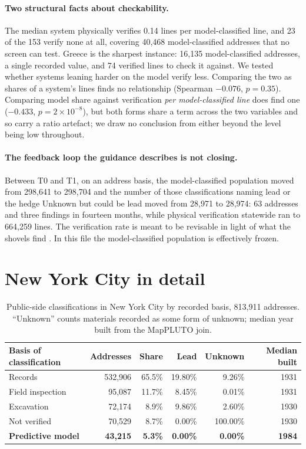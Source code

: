 \documentclass[11pt]{article}
\newcommand{\CBL}{\textsf{Unknown but could be lead}}
\begin{document}
\paragraph{Two structural facts about checkability.}
The median system physically verifies 0.14 lines per model-classified line, and 23 of the 153
verify none at all, covering 40,468 model-classified addresses that no screen can test. Greece
is the sharpest instance: 16,135 model-classified addresses, a single recorded value, and 74
verified lines to check it against. We tested whether systems leaning harder on the model
verify less. Comparing the two as shares of a system's lines finds no relationship (Spearman
$-0.076$, $p = 0.35$). Comparing model share against verification \emph{per model-classified
line} does find one ($-0.433$, $p = 2 \times 10^{-8}$), but both forms share a term across the
two variables and so carry a ratio artefact; we draw no conclusion from either beyond the
level being low throughout.

\paragraph{The feedback loop the guidance describes is not closing.}
Between T0 and T1, on an address basis, the model-classified population moved from 298,641 to
298,704 and the number of those classifications naming lead or the hedge \CBL{} moved from
28,971 to 28,974: 63 addresses and three findings in fourteen months, while physical
verification statewide
ran to 664,259 lines. The verification rate is meant to be revisable in light of what the
shovels find \cite{nysdohguidance2025}. In this file the model-classified population is
effectively frozen.

\section{New York City in detail}\label{sec:nyc}

\begin{table}[t]\centering\small
\caption{Public-side classifications in New York City by recorded basis, 813,911 addresses.
``Unknown'' counts materials recorded as some form of unknown; median year built from the
MapPLUTO join.}
\label{tab:methods}
\begin{tabular}{lrrrrr}
\toprule
Basis of classification & Addresses & Share & Lead & Unknown & Median built \\
\midrule
Records                   & 532,906 & 65.5\% & 19.80\% & 9.26\%   & 1931 \\
Field inspection          &  95,087 & 11.7\% &  8.45\% & 0.01\%   & 1931 \\
Excavation                &  72,174 &  8.9\% &  9.86\% & 2.60\%   & 1930 \\
Not verified              &  70,529 &  8.7\% &  0.00\% & 100.00\% & 1930 \\
\textbf{Predictive model} & \textbf{43,215} & \textbf{5.3\%} & \textbf{0.00\%} & \textbf{0.00\%} & \textbf{1984} \\
\bottomrule
\end{tabular}
\end{table}
\end{document}
